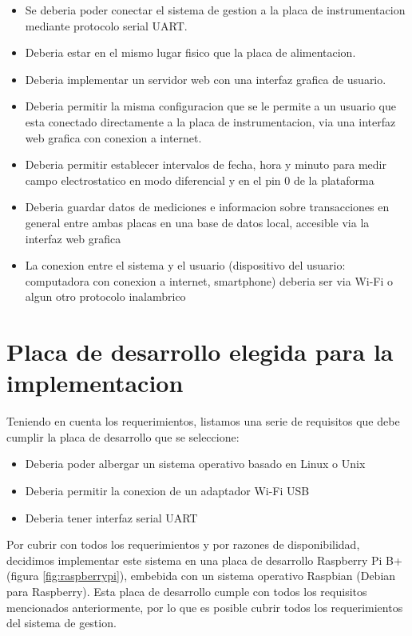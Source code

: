 \begin{itemize}
\item Se deberia poder conectar el sistema de gestion a la placa de instrumentacion mediante protocolo serial UART.
\item Deberia estar en el mismo lugar fisico que la placa de alimentacion.
\item Deberia implementar un servidor web con una interfaz grafica de usuario.
\item Deberia permitir la misma configuracion que se le permite a un usuario que esta conectado directamente a la placa de instrumentacion, via una interfaz web grafica con conexion a internet. 
\item Deberia permitir establecer intervalos de fecha, hora y minuto para medir campo electrostatico en modo diferencial y en el pin 0 de la plataforma
\item Deberia guardar datos de mediciones e informacion sobre transacciones en general entre ambas placas en una base de datos local, accesible via la interfaz web grafica 
\item La conexion entre el sistema y el usuario (dispositivo del usuario: computadora con conexion a internet, smartphone) deberia ser via Wi-Fi o algun otro protocolo inalambrico
\end{itemize}



\section{Placa de desarrollo elegida para la implementacion} %
\label{it7:sec:placa_de_desarrollo_elegida_para_la_implementacion}

Teniendo en cuenta los requerimientos, listamos una serie de requisitos que debe cumplir la placa de desarrollo que se seleccione:

\begin{itemize}
  \item Deberia poder albergar un sistema operativo basado en Linux o Unix
  \item Deberia permitir la conexion de un adaptador Wi-Fi USB
  \item Deberia tener interfaz serial UART
\end{itemize}

Por cubrir con todos los requerimientos y por razones de disponibilidad, decidimos implementar este sistema en una placa de desarrollo Raspberry Pi B+ (figura \ref{fig:raspberrypi}), embebida con un sistema operativo Raspbian (Debian para Raspberry). Esta placa de desarrollo cumple con todos los requisitos mencionados anteriormente, por lo que es posible cubrir todos los requerimientos del sistema de gestion.

